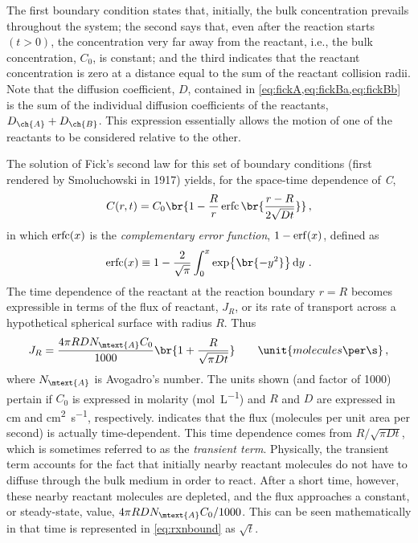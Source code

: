 \documentclass[nobib,nofonts,nols,nohyper]{tufte-handout}
\begin{document}
The first boundary condition states that, initially, the bulk concentration prevails throughout the system; the second says that, even after the reaction starts \( (t > 0) \), the concentration very far away from the reactant, i.e., the bulk concentration, \( C_0 \), is constant; and the third indicates that the reactant concentration is zero at a distance equal to the sum of the reactant collision radii. 
Note that the diffusion coefficient, \( D \), contained in \cref{eq:fickA,eq:fickBa,eq:fickBb} is the sum of the individual diffusion coefficients of the reactants, \( D_{\ch{A}} + D_{\ch{B}} \). 
This expression essentially allows the motion of one of the reactants to be considered relative to the other. 

The solution of Fick's second law for this set of boundary conditions (first rendered by Smoluchowski in 1917) yields, for the space-time dependence of \emph{C},
\begin{equation}
	C(r, t) = C_0 \br{ 1 - \frac{R}{r} \erfc\br{ \frac{r-R}{2 \sqrt{D t} }}} \, , 
\end{equation}
in which \( \operatorname{erfc}(x) \) is the \emph{complementary error function}, \( 1 - \erf(x) \), defined as
\[
	\erfc(x) \equiv 1 - \frac{2}{\sqrt{\pi}}\int_0^x \exp\br{ -y^2 } \dd{y} \, .
\]
The time dependence of the reactant at the reaction boundary \( r = R \) becomes expressible in terms of the flux of reactant, \( J_R \), or its rate of transport across a hypothetical spherical surface with radius \( R \). 
Thus
\begin{equation}
	J_R = \frac{4\pi R D N_\mtext{A} C_0}{1000} \br{ 1 + \frac{R}{\sqrt{\pi D t}}} \qquad \unit{molecules \per \s} \, ,
	\label{eq:rxnbound}
\end{equation}
where \( N_\mtext{A} \) is Avogadro's number. 
The units shown (and factor of 1000) pertain if \( C_0 \) is expressed in molarity (\unit{\mol\per\liter}) and \( R \) and \( D \) are expressed in \unit{\cm} and \unit{\cm\squared \per \s}, respectively.
 indicates that the flux (molecules per unit area per second) is actually time-dependent. 
This time dependence comes from \( R/\sqrt{\pi D t} \), which is sometimes referred to as the \emph{transient term}. 
Physically, the transient term accounts for the fact that initially nearby reactant molecules do not have to diffuse through the bulk medium in order to react. 
After a short time, however, these nearby reactant molecules are depleted, and the flux approaches a constant, or steady-state, value, \( 4\pi R D N_\mtext{A} C_0 / 1000 \). 
This can be seen mathematically in that time is represented in \cref{eq:rxnbound} as \( \sqrt{t} \). 
\end{document}
